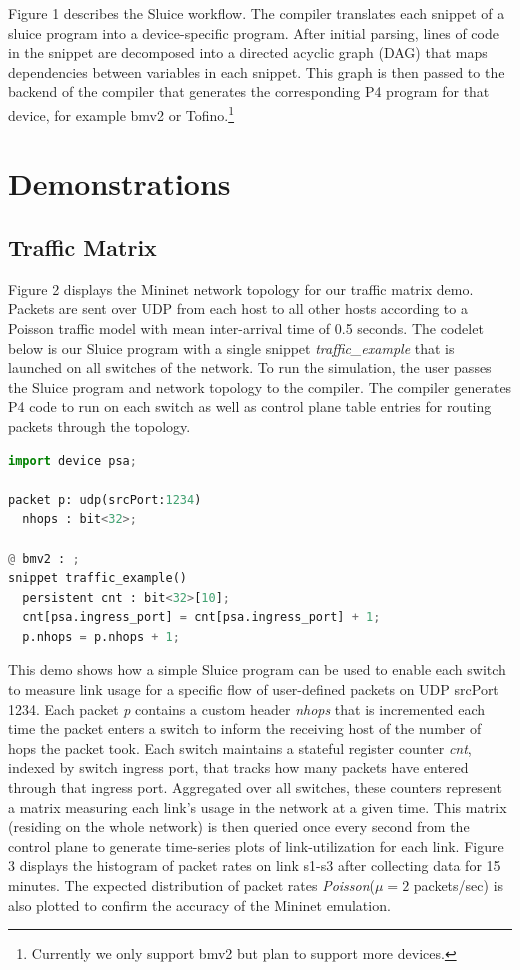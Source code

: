 Figure 1 describes the Sluice workflow. The compiler translates each snippet of
a sluice program into a device-specific program. After initial parsing, lines
of code in the snippet are decomposed into a directed acyclic graph (DAG) that
maps dependencies between variables in each snippet. This graph is then passed
to the backend of the compiler that generates the corresponding P4 program for
that device, for example bmv2 or Tofino.\footnote{Currently we only support
bmv2 but plan to support more devices.} 


\section{Demonstrations}
 
\subsection{Traffic Matrix}

Figure 2 displays the Mininet network topology for our traffic matrix demo.
Packets are sent over UDP from each host to all other hosts according to a
Poisson traffic model with mean inter-arrival time of 0.5 seconds. The codelet
below is our Sluice program with a single snippet \textit{traffic\_example}
that is launched on all switches of the network. To run the simulation, the
user passes the Sluice program and network topology to the compiler. The
compiler generates P4 code to run on each switch as well as control plane table
entries for routing packets through the topology.

\begin{lstlisting}[language=Python, basicstyle=\scriptsize]
import device psa;

packet p: udp(srcPort:1234)
  nhops : bit<32>;

@ bmv2 : ;
snippet traffic_example()
  persistent cnt : bit<32>[10];
  cnt[psa.ingress_port] = cnt[psa.ingress_port] + 1;
  p.nhops = p.nhops + 1;
\end{lstlisting}

This demo shows how a simple Sluice program can be used to enable each switch
to measure link usage for a specific flow of user-defined packets on UDP
srcPort 1234. Each packet \textit{p} contains a custom header \textit{nhops}
that is incremented each time the packet enters a switch to inform the
receiving host of the number of hops the packet took. Each switch maintains a
stateful register counter \textit{cnt}, indexed by switch ingress port, that
tracks how many packets have entered through that ingress port. Aggregated over
all switches, these counters represent a matrix measuring each link's
usage in the network at a given time. This matrix (residing on the whole
network) is then queried once every second from the control plane to generate
time-series plots of link-utilization for each link. Figure 3 displays the
histogram of packet rates on link s1-s3 after collecting data for 15 minutes.
The expected distribution of packet rates \textit{Poisson}($\mu = 2$
packets/sec) is also plotted to confirm the accuracy of the Mininet emulation.

